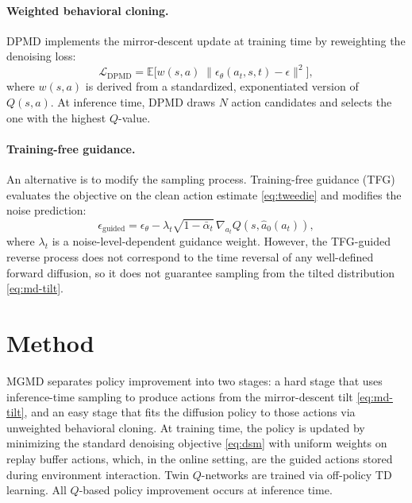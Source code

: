 \documentclass{article}
\theoremstyle{plain}
\theoremstyle{definition}
\theoremstyle{remark}
\newcommand{\E}{\mathbb{E}}
\begin{document}
\paragraph{Weighted behavioral cloning.}
DPMD \citep{ma2025soft} implements the mirror-descent update at training time by reweighting the denoising loss:
\begin{equation}
  \mathcal{L}_{\text{DPMD}} = \E\big[ w(s,a) \; \| \epsilon_\theta(a_t,s,t) - \epsilon \|^2 \big],
\end{equation}
where $w(s,a)$ is derived from a standardized, exponentiated version of $Q(s,a)$.
At inference time, DPMD draws $N$ action candidates and selects the one with the highest $Q$-value.

\paragraph{Training-free guidance.}
An alternative is to modify the sampling process.
Training-free guidance (TFG) \citep{ye2024tfg,bansal2023universal} evaluates the objective on the clean action estimate \cref{eq:tweedie} and modifies the noise prediction:
\begin{equation}
  \epsilon_{\text{guided}} = \epsilon_\theta - \lambda_t \sqrt{1-\bar{\alpha}_t}\, \nabla_{a_t} Q(s, \hat{a}_0(a_t)),
  \label{eq:tfg-update}
\end{equation}
where $\lambda_t$ is a noise-level-dependent guidance weight.
However, the TFG-guided reverse process does not correspond to the time reversal of any well-defined forward diffusion, so it does not guarantee sampling from the tilted distribution \cref{eq:md-tilt}.

\section{Method}
\label{sec:methods}

MGMD separates policy improvement into two stages: a hard stage that uses inference-time sampling to produce actions from the mirror-descent tilt \cref{eq:md-tilt}, and an easy stage that fits the diffusion policy to those actions via unweighted behavioral cloning.
At training time, the policy is updated by minimizing the standard denoising objective \cref{eq:dsm} with uniform weights on replay buffer actions, which, in the online setting, are the guided actions stored during environment interaction.
Twin $Q$-networks are trained via off-policy TD learning.
All $Q$-based policy improvement occurs at inference time.
\end{document}
